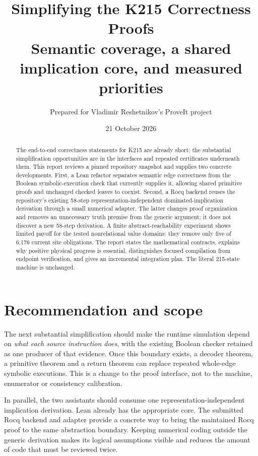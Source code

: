 \documentclass[11pt]{article}
\title{Simplifying the K215 Correctness Proofs\\\large Semantic coverage, a shared implication core, and measured priorities}
\author{Prepared for Vladimir Reshetnikov's ProveIt project}
\date{21 October 2026}
\begin{document}
\maketitle
\begin{abstract}
The end-to-end correctness statements for K215 are already short; the substantial simplification opportunities are in the interfaces and repeated certificates underneath them. This report reviews a pinned repository snapshot and supplies two concrete developments. First, a Lean refactor separates semantic edge correctness from the Boolean symbolic-execution check that currently supplies it, allowing shared primitive proofs and unchanged checked leaves to coexist. Second, a Rocq backend reuses the repository's existing 58-step representation-independent dominated-implication derivation through a small numerical adapter. The latter changes proof organization and removes an unnecessary truth premise from the generic argument; it does not discover a new 58-step derivation. A finite abstract-reachability experiment shows limited payoff for the tested nonrelational value domains: they remove only five of 6,176 current site obligations. The report states the mathematical contracts, explains why positive physical progress is essential, distinguishes focused compilation from endpoint verification, and gives an incremental integration plan. The literal 215-state machine is unchanged.
\end{abstract}
\tableofcontents
\newpage

\section{Recommendation and scope}

The next substantial simplification should make the runtime simulation depend on \emph{what each source instruction does}, with the existing Boolean checker retained as one producer of that evidence. Once this boundary exists, a decoder theorem, a primitive theorem and a return theorem can replace repeated whole-edge symbolic executions. This is a change to the proof interface, not to the machine, enumerator or consistency calibration.

In parallel, the two assistants should consume one representation-independent implication derivation. Lean already has the appropriate core. The submitted Rocq backend and adapter provide a concrete way to bring the maintained Rocq proof to the same abstraction boundary. Keeping numerical coding outside the generic derivation makes its logical assumptions visible and reduces the amount of code that must be reviewed twice.
\end{document}
